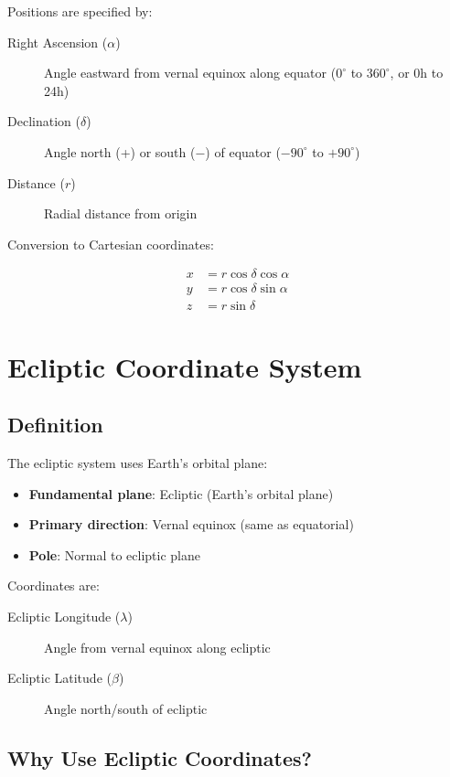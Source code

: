 Positions are specified by:

\begin{description}
    \item[Right Ascension ($\alpha$)] Angle eastward from vernal equinox along equator ($0^\circ$ to $360^\circ$, or 0h to 24h)
    \item[Declination ($\delta$)] Angle north (+) or south ($-$) of equator ($-90^\circ$ to $+90^\circ$)
    \item[Distance ($r$)] Radial distance from origin
\end{description}

Conversion to Cartesian coordinates:

\begin{align}
x &= r \cos\delta \cos\alpha \\
y &= r \cos\delta \sin\alpha \\
z &= r \sin\delta
\end{align}

\section{Ecliptic Coordinate System}

\subsection{Definition}

The ecliptic system uses Earth's orbital plane:

\begin{itemize}
    \item \textbf{Fundamental plane}: Ecliptic (Earth's orbital plane)
    \item \textbf{Primary direction}: Vernal equinox (same as equatorial)
    \item \textbf{Pole}: Normal to ecliptic plane
\end{itemize}

Coordinates are:
\begin{description}
    \item[Ecliptic Longitude ($\lambda$)] Angle from vernal equinox along ecliptic
    \item[Ecliptic Latitude ($\beta$)] Angle north/south of ecliptic
\end{description}

\subsection{Why Use Ecliptic Coordinates?}

